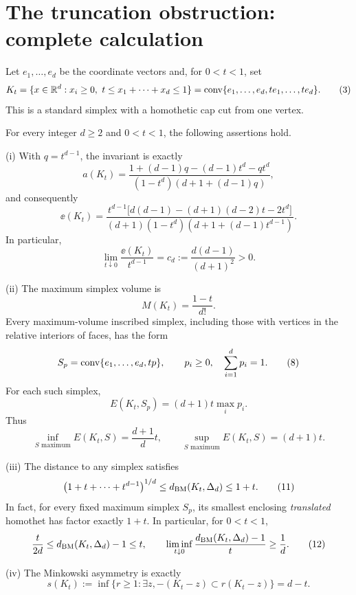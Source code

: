 \section{The truncation obstruction: complete calculation}

Let $e_1,\ldots,e_d$ be the coordinate vectors and, for $0<t<1$, set
\[
 K_t=\{x\in\mathbb R^d:x_i\ge0,\ t\le x_1+\cdots+x_d\le1\}
     =\operatorname{conv}\{e_1,\ldots,e_d,te_1,\ldots,te_d\}.
 \tag{3}
\]
This is a standard simplex with a homothetic cap cut from one vertex.

\begin{theorem}\label{thm:exact}
For every integer $d\ge2$ and $0<t<1$, the following assertions hold.

\medskip\noindent
\textup{(i)} With $q=t^{d-1}$, the invariant is exactly
\[
 a(K_t)=
 \frac{1+(d-1)q-(d-1)t^d-qt^d}
 {(1-t^d)(d+1+(d-1)q)},
 \tag{4}
\]
and consequently
\[
 \ee(K_t)=
 \frac{t^{d-1}\bigl[d(d-1)-(d+1)(d-2)t-2t^d\bigr]}
 {(d+1)(1-t^d)(d+1+(d-1)t^{d-1})}.
 \tag{5}
\]
In particular,
\[
 \lim_{t\downarrow0}\frac{\ee(K_t)}{t^{d-1}}
   =c_d:=\frac{d(d-1)}{(d+1)^2}>0.
 \tag{6}
\]

\medskip\noindent
\textup{(ii)} The maximum simplex volume is
\[
 M(K_t)=\frac{1-t}{d!}.
 \tag{7}
\]
Every maximum-volume inscribed simplex, including those with vertices in the
relative interiors of faces, has the form
\[
 S_p=\operatorname{conv}\{e_1,\ldots,e_d,tp\},\qquad
 p_i\ge0,\quad\sum_{i=1}^d p_i=1.
 \tag{8}
\]
For each such simplex,
\[
 E(K_t,S_p)=(d+1)t\max_i p_i.
 \tag{9}
\]
Thus
\[
 \inf_{S\text{ maximum}}E(K_t,S)=\frac{d+1}{d}t,
 \qquad
 \sup_{S\text{ maximum}}E(K_t,S)=(d+1)t.
 \tag{10}
\]

\medskip\noindent
\textup{(iii)} The distance to any simplex satisfies
\[
 \left(1+t+\cdots+t^{d-1}\right)^{1/d}
 \le d_{\mathrm{BM}}(K_t,\Delta_d)\le 1+t.
 \tag{11}
\]
In fact, for every fixed maximum simplex $S_p$, its smallest enclosing
\emph{translated} homothet has factor exactly $1+t$.
In particular, for $0<t<1$,
\[
 \frac{t}{2d}\le d_{\mathrm{BM}}(K_t,\Delta_d)-1\le t,
 \qquad
 \liminf_{t\downarrow0}\frac{d_{\mathrm{BM}}(K_t,\Delta_d)-1}{t}\ge\frac1d.
 \tag{12}
\]

\medskip\noindent
\textup{(iv)} The Minkowski asymmetry is exactly
\[
 s(K_t):=\inf\{r\ge1:\exists z,
              -(K_t-z)\subset r(K_t-z)\}=d-t.
 \tag{13}
\]
\end{theorem}

